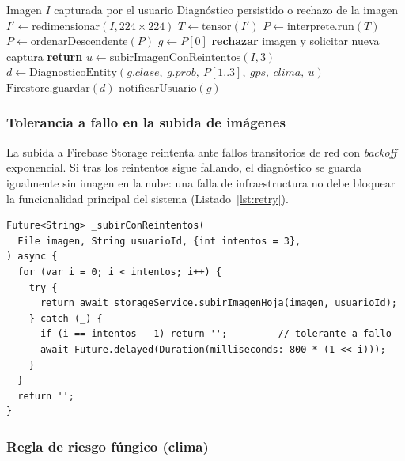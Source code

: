\documentclass[12pt,a4paper]{article}
\begin{document}
\begin{algorithm}[H]
\caption{Clasificación de una hoja de zapallo}
\label{alg:clasificacion}
\begin{algorithmic}[1]
\Require Imagen $I$ capturada por el usuario
\Ensure Diagnóstico persistido o rechazo de la imagen
\State $I' \gets \text{redimensionar}(I, 224 \times 224)$
\State $T \gets \text{tensor}(I')$ 
\State $P \gets \text{interprete.run}(T)$ 
\State $P \gets \text{ordenarDescendente}(P)$
\State $g \gets P[0]$ 
  \State \textbf{rechazar} imagen y solicitar nueva captura
  \State \textbf{return}
\EndIf
\State $u \gets \text{subirImagenConReintentos}(I, 3)$ 
\State $d \gets \text{DiagnosticoEntity}(g.clase,\ g.prob,\ P[1..3],\ gps,\ clima,\ u)$
\State $\text{Firestore.guardar}(d)$
  \State $\text{notificarUsuario}(g)$
\EndIf
\end{algorithmic}
\end{algorithm}

\subsubsection{Tolerancia a fallo en la subida de imágenes}

La subida a Firebase Storage reintenta ante fallos transitorios de red con
\textit{backoff} exponencial. Si tras los reintentos sigue fallando, el
diagnóstico se guarda igualmente sin imagen en la nube: una falla de
infraestructura no debe bloquear la funcionalidad principal del sistema
(Listado~\ref{lst:retry}).

\begin{lstlisting}[caption={Subida con reintentos y \textit{backoff} exponencial}, label={lst:retry}]
Future<String> _subirConReintentos(
  File imagen, String usuarioId, {int intentos = 3},
) async {
  for (var i = 0; i < intentos; i++) {
    try {
      return await storageService.subirImagenHoja(imagen, usuarioId);
    } catch (_) {
      if (i == intentos - 1) return '';         // tolerante a fallo
      await Future.delayed(Duration(milliseconds: 800 * (1 << i)));
    }
  }
  return '';
}
\end{lstlisting}

\subsubsection{Regla de riesgo fúngico (clima)}
\end{document}
